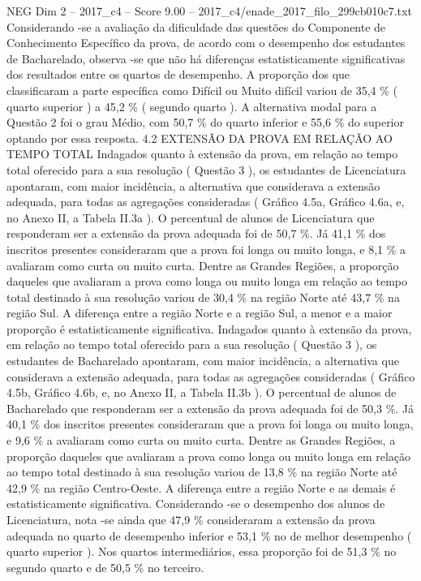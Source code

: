 \begin{textsample}{NEG Dim 2 – 2017\_c4 – Score 9.00 – 2017\_c4/enade\_2017\_filo\_299cb010c7.txt}
Considerando -se a avaliação da dificuldade das questões do Componente de Conhecimento Específico da prova, de acordo com o desempenho dos estudantes de Bacharelado, observa -se que não há diferenças estatisticamente significativas dos resultados entre os quartos de desempenho.
A proporção dos que classificaram a parte específica como Difícil ou Muito difícil variou de 35,4 \% ( quarto superior ) a 45,2 \% ( segundo quarto ).
A alternativa modal para a Questão 2 foi o grau Médio, com 50,7 \% do quarto inferior e 55,6 \% do superior optando por essa resposta. 4.2 EXTENSÃO DA PROVA EM RELAÇÃO AO TEMPO TOTAL Indagados quanto à extensão da prova, em relação ao tempo total oferecido para a sua resolução ( Questão 3 ), os estudantes de Licenciatura apontaram, com maior incidência, a alternativa que considerava a extensão adequada, para todas as agregações consideradas ( Gráfico 4.5a, Gráfico 4.6a, e, no Anexo II, a Tabela II.3a ).
O percentual de alunos de Licenciatura que responderam ser a extensão da prova adequada foi de 50,7 \%.
Já 41,1 \% dos inscritos presentes consideraram que a prova foi longa ou muito longa, e 8,1 \% a avaliaram como curta ou muito curta.
Dentre as Grandes Regiões, a proporção daqueles que avaliaram a prova como longa ou muito longa em relação ao tempo total destinado à sua resolução variou de 30,4 \% na região Norte até 43,7 \% na região Sul.
A diferença entre a região Norte e a região Sul, a menor e a maior proporção é estatisticamente significativa.
Indagados quanto à extensão da prova, em relação ao tempo total oferecido para a sua resolução ( Questão 3 ), os estudantes de Bacharelado apontaram, com maior incidência, a alternativa que considerava a extensão adequada, para todas as agregações consideradas ( Gráfico 4.5b, Gráfico 4.6b, e, no Anexo II, a Tabela II.3b ).
O percentual de alunos de Bacharelado que responderam ser a extensão da prova adequada foi de 50,3 \%.
Já 40,1 \% dos inscritos presentes consideraram que a prova foi longa ou muito longa, e 9,6 \% a avaliaram como curta ou muito curta.
Dentre as Grandes Regiões, a proporção daqueles que avaliaram a prova como longa ou muito longa em relação ao tempo total destinado à sua resolução variou de 13,8 \% na região Norte até 42,9 \% na região Centro-Oeste.
A diferença entre a região Norte e as demais é estatisticamente significativa.
Considerando -se o desempenho dos alunos de Licenciatura, nota -se ainda que 47,9 \% consideraram a extensão da prova adequada no quarto de desempenho inferior e 53,1 \% no de melhor desempenho ( quarto superior ).
Nos quartos intermediários, essa proporção foi de 51,3 \% no segundo quarto e de 50,5 \% no terceiro.

\end{textsample}
